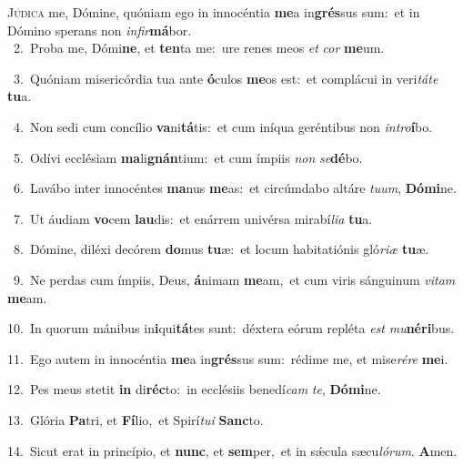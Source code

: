 \lettrine{\initial\textcolor{\initialcolor}{J}}{údica} me, Dómine, quóniam ego in innocéntia \textbf{me}\-a in\-\textbf{grés}\-sus sum:~\star et in Dómino sperans non \textit{in}\-\textit{fir}\textbf{má}bor.\\
{\numbfont\textcolor{\numbcolor}{~2.}}~Proba me, Dómi\-\textbf{ne}\-, et \textbf{ten}\-ta me:~\star ure renes meos \textit{et} \textit{cor} \textbf{me}\-um.\par
{\numbfont\textcolor{\numbcolor}{~3.}}~Quóniam misericórdia tua ante \textbf{ó}\-culos \textbf{me}\-os est:~\star et complácui in veri\-\textit{tá}\-\textit{te} \textbf{tu}\-a.\par
{\numbfont\textcolor{\numbcolor}{~4.}}~Non sedi cum concílio \textbf{va}\-ni\-\textbf{tá}\-tis:~\star et cum iníqua geréntibus non \textit{in}\-\textit{tro}\textbf{í}bo.\par
{\numbfont\textcolor{\numbcolor}{~5.}}~Odívi ecclésiam \textbf{ma}\-li\-\textbf{gnán}\-tium:~\star et cum ímpiis \textit{non} \textit{se}\-\textbf{dé}bo.\par
{\numbfont\textcolor{\numbcolor}{~6.}}~Lavábo inter innocéntes \textbf{ma}\-nus \textbf{me}\-as:~\star et circúmdabo altáre \textit{tu}\-\textit{um}, \textbf{Dó}\-\textbf{mi}ne.\par
{\numbfont\textcolor{\numbcolor}{~7.}}~Ut áudiam \textbf{vo}\-cem \textbf{lau}\-dis:~\star et enárrem univérsa mirabí\-\textit{li}\-\textit{a} \textbf{tu}\-a.\par
{\numbfont\textcolor{\numbcolor}{~8.}}~Dómine, diléxi decórem \textbf{do}\-mus \textbf{tu}\-æ:~\star et locum habitatiónis gló\-\textit{ri}\-\textit{æ} \textbf{tu}\-æ.\par
{\numbfont\textcolor{\numbcolor}{~9.}}~Ne perdas cum ímpiis, Deus, \textbf{á}\-nimam \textbf{me}\-am,~\star et cum viris sánguinum \textit{vi}\-\textit{tam} \textbf{me}\-am.\par
{\numbfont\textcolor{\numbcolor}{10.}}~In quorum mánibus in\-\textbf{i}\-qui\-\textbf{tá}\-tes sunt:~\star déxtera eórum repléta \textit{est} \textit{mu}\-\textbf{né}\textbf{ri}bus.\par
{\numbfont\textcolor{\numbcolor}{11.}}~Ego autem in innocéntia \textbf{me}\-a in\-\textbf{grés}\-sus sum:~\star rédime me, et mise\-\textit{ré}\-\textit{re} \textbf{me}\-i.\par
{\numbfont\textcolor{\numbcolor}{12.}}~Pes meus stetit \textbf{in} di\-\textbf{réc}\-to:~\star in ecclésiis benedí\textit{cam} \textit{te}\-, \textbf{Dó}\-\textbf{mi}ne.\par
{\numbfont\textcolor{\numbcolor}{13.}}~Glória \textbf{Pa}\-tri, et \textbf{Fí}\-lio,~\star et Spirí\-\textit{tu}\-\textit{i} \textbf{Sanc}\-to.\par
{\numbfont\textcolor{\numbcolor}{14.}}~Sicut erat in princípio, et \textbf{nunc}\-, et \textbf{sem}\-per,~\star et in sǽcula sæcu\-\textit{ló}\-\textit{rum}. \textbf{A}\-men.\par
